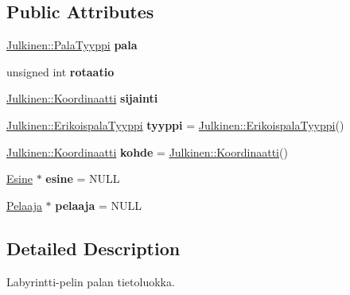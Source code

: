 \subsection*{Public Attributes}
\begin{DoxyCompactItemize}
\item 
\hypertarget{class_pala_a800e05c778f3840d5b6cab3dc87f04af}{}\hyperlink{namespace_julkinen_a272c70e0503191a485c8a9cd4281e6f5}{Julkinen\+::\+Pala\+Tyyppi} {\bfseries pala}\label{class_pala_a800e05c778f3840d5b6cab3dc87f04af}

\item 
\hypertarget{class_pala_a0a0d1ef610c373bbd8f898cde6538a23}{}unsigned int {\bfseries rotaatio}\label{class_pala_a0a0d1ef610c373bbd8f898cde6538a23}

\item 
\hypertarget{class_pala_aa4ae7ca61e68d684389625b4e34ffa6b}{}\hyperlink{class_julkinen_1_1_koordinaatti}{Julkinen\+::\+Koordinaatti} {\bfseries sijainti}\label{class_pala_aa4ae7ca61e68d684389625b4e34ffa6b}

\item 
\hypertarget{class_pala_a48ddab2b6bdc1c541289d296bc8db7af}{}\hyperlink{namespace_julkinen_afc26052e09d0b2214f749492cc5fff19}{Julkinen\+::\+Erikoispala\+Tyyppi} {\bfseries tyyppi} = \hyperlink{namespace_julkinen_afc26052e09d0b2214f749492cc5fff19}{Julkinen\+::\+Erikoispala\+Tyyppi}()\label{class_pala_a48ddab2b6bdc1c541289d296bc8db7af}

\item 
\hypertarget{class_pala_acab51bd466aa1ff640683094d1eb0d20}{}\hyperlink{class_julkinen_1_1_koordinaatti}{Julkinen\+::\+Koordinaatti} {\bfseries kohde} = \hyperlink{class_julkinen_1_1_koordinaatti}{Julkinen\+::\+Koordinaatti}()\label{class_pala_acab51bd466aa1ff640683094d1eb0d20}

\item 
\hypertarget{class_pala_a35fceec264ac79f3ddf3c12a4e3cde1f}{}\hyperlink{class_esine}{Esine} $\ast$ {\bfseries esine} = N\+U\+L\+L\label{class_pala_a35fceec264ac79f3ddf3c12a4e3cde1f}

\item 
\hypertarget{class_pala_a9721ecfb8e78b412d5a6e0a72109e0e3}{}\hyperlink{class_pelaaja}{Pelaaja} $\ast$ {\bfseries pelaaja} = N\+U\+L\+L\label{class_pala_a9721ecfb8e78b412d5a6e0a72109e0e3}

\end{DoxyCompactItemize}


\subsection{Detailed Description}
Labyrintti-\/pelin palan tietoluokka. 

